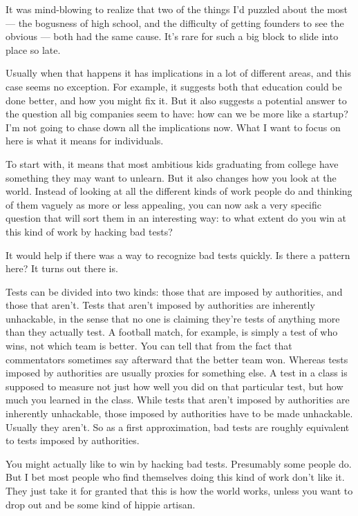 It was mind-blowing to realize that two of the things I'd puzzled about
the most --- the bogusness of high school, and the difficulty of getting
founders to see the obvious --- both had the same cause. It's rare for
such a big block to slide into place so late.

Usually when that happens it has implications in a lot of different
areas, and this case seems no exception. For example, it suggests both
that education could be done better, and how you might fix it. But it
also suggests a potential answer to the question all big companies seem
to have: how can we be more like a startup? I'm not going to chase down
all the implications now. What I want to focus on here is what it means
for individuals.

To start with, it means that most ambitious kids graduating from college
have something they may want to unlearn. But it also changes how you
look at the world. Instead of looking at all the different kinds of work
people do and thinking of them vaguely as more or less appealing, you
can now ask a very specific question that will sort them in an
interesting way: to what extent do you win at this kind of work by
hacking bad tests?

It would help if there was a way to recognize bad tests quickly. Is
there a pattern here? It turns out there is.

Tests can be divided into two kinds: those that are imposed by
authorities, and those that aren't. Tests that aren't imposed by
authorities are inherently unhackable, in the sense that no one is
claiming they're tests of anything more than they actually test. A
football match, for example, is simply a test of who wins, not which
team is better. You can tell that from the fact that commentators
sometimes say afterward that the better team won. Whereas tests imposed
by authorities are usually proxies for something else. A test in a class
is supposed to measure not just how well you did on that particular
test, but how much you learned in the class. While tests that aren't
imposed by authorities are inherently unhackable, those imposed by
authorities have to be made unhackable. Usually they aren't. So as a
first approximation, bad tests are roughly equivalent to tests imposed
by authorities.

You might actually like to win by hacking bad tests. Presumably some
people do. But I bet most people who find themselves doing this kind of
work don't like it. They just take it for granted that this is how the
world works, unless you want to drop out and be some kind of hippie
artisan.


